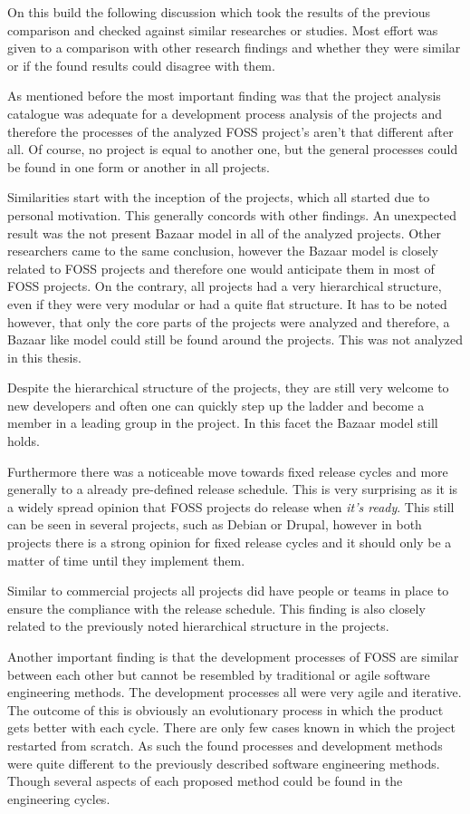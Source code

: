 On this build the following discussion which took the results of the previous
comparison and checked against similar researches or studies. Most effort was
given to a comparison with other research findings and whether they were
similar or if the found results could disagree with them.

As mentioned before the most important finding was that the project analysis
catalogue was adequate for a development process analysis of the projects and
therefore the processes of the analyzed \ac{FOSS} project's aren't that
different after all. Of course, no project is equal to another one, but the
general processes could be found in one form or another in all projects.

Similarities start with the inception of the projects, which all started due to
personal motivation. This generally concords with other findings. An unexpected
result was the not present Bazaar model in all of the analyzed projects. Other
researchers came to the same conclusion, however the Bazaar model is closely
related to \ac{FOSS} projects and therefore one would anticipate them in most
of \ac{FOSS} projects. On the contrary, all projects had a very hierarchical
structure, even if they were very modular or had a quite flat structure. It has
to be noted however, that only the core parts of the projects were analyzed and
therefore, a Bazaar like model could still be found around the projects. This
was not analyzed in this thesis.

Despite the hierarchical structure of the projects, they are still very welcome
to new developers and often one can quickly step up the ladder and become a
member in a leading group in the project. In this facet the Bazaar model
still holds.

Furthermore there was a noticeable move towards fixed release cycles and more
generally to a already pre-defined release schedule. This is very surprising as
it is a widely spread opinion that \ac{FOSS} projects do release when
\emph{it's ready}. This still can be seen in several projects, such as Debian
or Drupal, however in both projects there is a strong opinion for fixed release
cycles and it should only be a matter of time until they implement them.

Similar to commercial projects all projects did have people or teams in place
to ensure the compliance with the release schedule. This finding is also
closely related to the previously noted hierarchical structure in the projects.

Another important finding is that the development processes of \ac{FOSS} are
similar between each other but cannot be resembled by traditional or agile
software engineering methods. The development processes all were very agile and
iterative. The outcome of this is obviously an evolutionary process in which
the product gets better with each cycle. There are only few cases known in
which the project restarted from scratch. As such the found processes and
development methods were quite different to the previously described software
engineering methods. Though several aspects of each proposed method could be
found in the engineering cycles.

